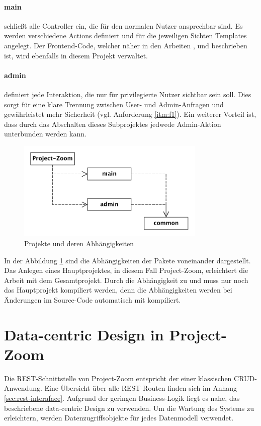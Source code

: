 \paragraph{main} schließt alle Controller ein, die für den normalen Nutzer ansprechbar sind. Es werden verschiedene Actions definiert und für die jeweiligen Sichten Templates angelegt. Der \gls{Frontend}-Code, welcher näher in den Arbeiten \cite{bp-norman}, \cite{bp-tomh} und \cite{bp-anita} beschrieben ist, wird ebenfalls in diesem Projekt verwaltet.

\paragraph{admin} definiert jede Interaktion, die nur 
für privilegierte Nutzer sichtbar sein soll. Dies sorgt für eine klare Trennung zwischen User- und Admin-Anfragen und gewährleistet mehr Sicherheit (vgl. Anforderung \ref{itm:f1}). Ein weiterer Vorteil ist, dass durch das Abschalten dieses Subprojektes jedwede Admin-Aktion unterbunden werden kann.

\begin{figure}[h]  
  \centering     
  \includegraphics[width=0.8\textwidth]{img/projekte.pdf}  
   \caption{Projekte und deren Abhängigkeiten}   
  \label{fig:projects} 
\end{figure}

\FloatBarrier
In der Abbildung \ref{fig:projects} sind die Abhängigkeiten der Pakete voneinander dargestellt. Das Anlegen eines Hauptprojektes, in diesem Fall Project-Zoom, erleichtert die Arbeit mit dem Gesamtprojekt. Durch die Abhängigkeit zu  und  muss nur noch das Hauptprojekt kompiliert werden, denn die Abhängigkeiten werden bei Änderungen im Source-Code automatisch mit kompiliert.

\section{Data-centric Design in Project-Zoom}
\label{sec:umsetzung_dcd}
Die REST-Schnittstelle von Project-Zoom entspricht der einer klassischen CRUD-Anwendung. Eine Übersicht über alle REST-Routen finden sich im Anhang \ref{sec:rest-interaface}. Aufgrund der geringen \gls{Business-Logik} liegt es nahe, das beschriebene data-centric Design zu verwenden. Um die Wartung des Systems zu erleichtern, werden Datenzugriffsobjekte für jedes Datenmodell verwendet.
\pagebreak %


